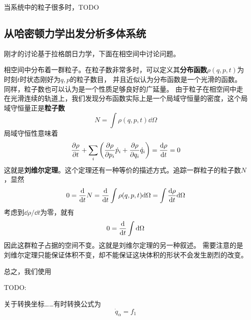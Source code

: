 \documentclass[UTF8, a4paper]{ctexart}
\begin{document}
当系统中的粒子很多时，TODO

\subsection{从哈密顿力学出发分析多体系统}

刚才的讨论基于拉格朗日力学，下面在相空间中讨论问题。

相空间中分布着一群粒子。在粒子数非常多时，可以定义其\textbf{分布函数}$\rho(q, p, t)$为时刻$t$时状态刚好为$q, p$的粒子数目，
并且近似认为分布函数是一个光滑的函数。同样，粒子数也可以认为是一个性质足够良好的广延量。
由于粒子在相空间中走在光滑连续的轨道上，我们发现分布函数实际上是一个局域守恒量的密度，这个局域守恒量正是\textbf{粒子数}
\begin{equation}
    N = \int \rho(q,p,t) \dd \Omega
\end{equation}
局域守恒性意味着
\begin{equation}
    \pdv{\rho}{t} + \sum_i \left( \pdv{\rho}{p_i} \dot{p}_i + \pdv{\rho}{q_i} \dot{q}_i \right) = \dv{\rho}{t} = 0
\end{equation}
这就是\textbf{刘维尔定理}。这个定理还有一种等价的描述方式。追踪一群粒子的粒子数$N$，显然
\[
    0 = \dv{t} N = \dv{t} \int \rho(q,p,t) \dd \Omega = \int \dv{\rho}{t} \dd \Omega
\]
考虑到$\dd \rho / \dd t$为零，就有
\[
    0 = \dv{t} \int \dd \Omega
\]
因此这群粒子占据的空间不变。这就是刘维尔定理的另一种叙述。
需要注意的是刘维尔定理只能保证体积不变，却不能保证这块体积的形状不会发生剧烈的改变。

总之，我们使用

TODO: 

关于转换坐标……有时转换公式为
\[
    \dot{q}_\alpha = f_1 
\]
\end{document}
